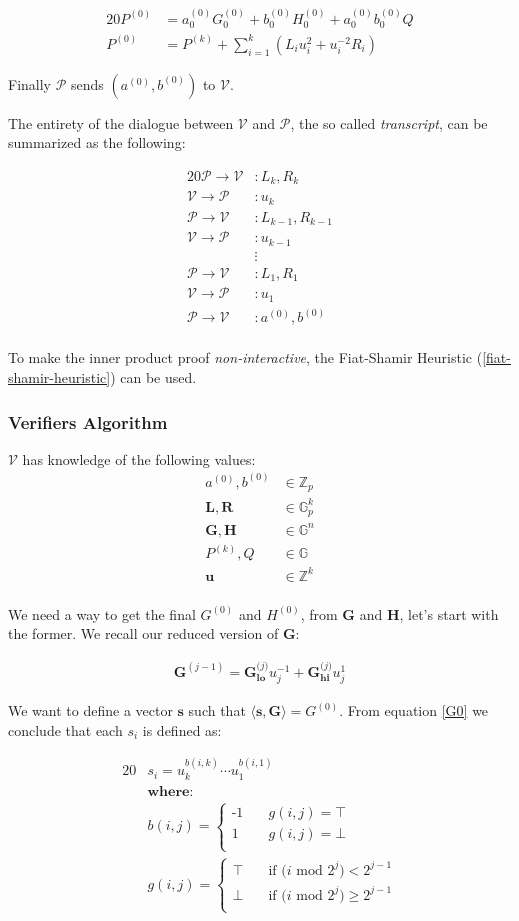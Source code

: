 \documentclass{article}
\newcommand{\eq}[1]{\begin{alignat*}{20}#1\end{alignat*}}
\newcommand{\eqn}[2]{\begin{equation}\label{#1}\begin{split}#2\end{split}\end{equation}}
\renewcommand{\vec}[1]{\boldsymbol{#1}}
\newcommand{\V}{\mathcal{V}}
\renewcommand{\P}{\mathcal{P}}
\newcommand{\G}{\mathbb{G}}
\newcommand{\Z}{\mathbb{Z}}
\newcommand{\dotp}[2]{\langle #1, #2 \rangle}
\newcommand{\opn}[1]{\operatorname{#1}}
\newcommand{\veclo}[1]{\vec{#1_{\opn{lo}}}}
\newcommand{\vechi}[1]{\vec{#1_{\opn{hi}}}}
\begin{document}
\eq{
	P^{(0)} &= a^{(0)}_0 G^{(0)}_0 + b^{(0)}_0 H^{(0)}_0 + a^{(0)}_0 b^{(0)}_0 Q \\
	P^{(0)} &= P^{(k)} + \sum^k_{i=1}(L_i u^2_i + u^{-2}_i R_i)
}

Finally $\P$ sends $(a^{(0)}, b^{(0)})$ to $\V$.

The entirety of the dialogue between $\V$ and $\P$,
the so called \textit{transcript}, can be summarized as the following:

\eq{
	\P \rightarrow \V &: L_k, R_k \\
	\V \rightarrow \P &: u_k \\[5pt]
	\P \rightarrow \V &: L_{k-1}, R_{k-1} \\
	\V \rightarrow \P &: u_{k-1} \\[-5pt]
	                  &\vdots \\
	\P \rightarrow \V &: L_{1}, R_{1} \\
	\V \rightarrow \P &: u_{1} \\[5pt]
	\P \rightarrow \V &: a^{(0)}, b^{(0)} \\
}

To make the inner product proof \textit{non-interactive}, the
Fiat-Shamir Heuristic (\ref{fiat-shamir-heuristic}) can be used.

\subsubsection{Verifiers Algorithm}
$\V$ has knowledge of the following values:
\eqn{def1-ver}{
	a^{(0)}, b^{(0)} &\in \Z_p \\
	\vec{L}, \vec{R} &\in \G_p^{k} \\
	\vec{G}, \vec{H} &\in \G^n \\
	P^{(k)}, Q &\in \G \\
	\vec{u} &\in \Z^{k} \\
}

We need a way to get the final $G^{(0)}$ and $H^{(0)}$, from $\vec{G}$
and $\vec{H}$, let's start with the former. We recall our reduced
version of $\vec{G}$:

\eqn{G0}{
	\vec{G}^{(j-1)} = \veclo{G^\textit{(j)}} u^{-1}_j + \vechi{G^\textit{(j)}} u^{1}_j
}

We want to define a vector $\vec{s}$ such that $\dotp{\vec{s}}{\vec{G}}
= G^{(0)}$. From equation \ref{G0} we conclude that each $s_i$ is
defined as:

\eq{
	&s_i = u^{b(i,k)}_k \cdots u^{b(i,1)}_1 \\
	&\textbf{where:} \\
	&b(i,j) = 
	\begin{cases}
		\text{-1} &\quad  g(i,j) = \top \\
		\text{1}  &\quad  g(i,j) = \bot \\
	\end{cases} \\
	&g(i,j) = 
	\begin{cases}
		\top &\quad  \text{if $(i$ mod $2^j) <    2^{j-1}$} \\
		\bot &\quad  \text{if $(i$ mod $2^j) \geq 2^{j-1}$} \\
	\end{cases}
}
\end{document}
